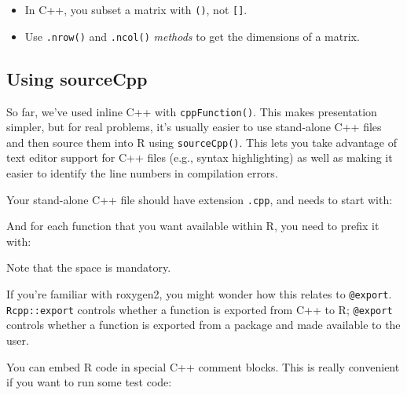 \begin{itemize}
\item
  In C++, you subset a matrix with \texttt{()}, not \texttt{{[}{]}}.
\item
  Use \texttt{.nrow()} and \texttt{.ncol()} \emph{methods} to get the
  dimensions of a matrix.
\end{itemize}

\hypertarget{sourceCpp}{%
\subsection{Using sourceCpp}\label{sourceCpp}}

So far, we've used inline C++ with \texttt{cppFunction()}. This makes
presentation simpler, but for real problems, it's usually easier to use
stand-alone C++ files and then source them into R using
\texttt{sourceCpp()}. This lets you take advantage of text editor
support for C++ files (e.g., syntax highlighting) as well as making it
easier to identify the line numbers in compilation errors.

Your stand-alone C++ file should have extension \texttt{.cpp}, and needs
to start with:

\begin{Shaded}
\begin{Highlighting}[]
 
\end{Highlighting}
\end{Shaded}

And for each function that you want available within R, you need to
prefix it with:

\begin{Shaded}
\begin{Highlighting}[]
\end{Highlighting}
\end{Shaded}

Note that the space is mandatory.

If you're familiar with roxygen2, you might wonder how this relates to
\texttt{@export}. \texttt{Rcpp::export} controls whether a function is
exported from C++ to R; \texttt{@export} controls whether a function is
exported from a package and made available to the user.

You can embed R code in special C++ comment blocks. This is really
convenient if you want to run some test code:

